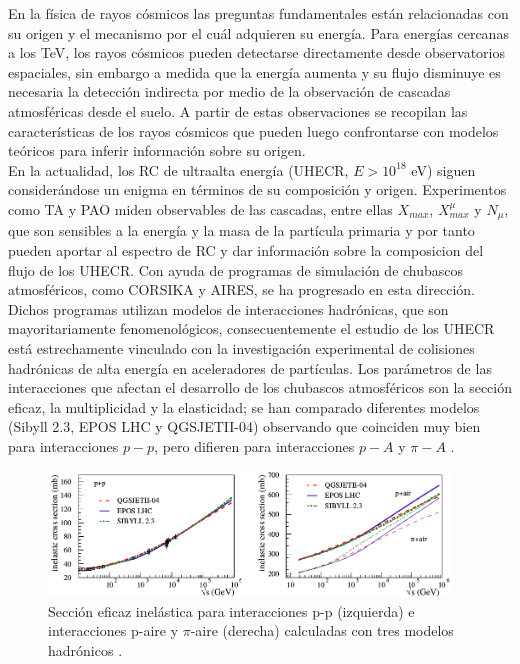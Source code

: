 En la f\'isica de rayos c\'osmicos las preguntas fundamentales est\'an relacionadas con su origen y el mecanismo por el cu\'al adquieren su energ\'ia. Para energ\'ias cercanas a los TeV, los rayos c\'osmicos pueden detectarse directamente desde observatorios espaciales, sin embargo a medida que la energ\'ia aumenta y su flujo disminuye es necesaria la detecci\'on indirecta por medio de la observaci\'on de cascadas atmosf\'ericas desde el suelo. A partir de estas observaciones se recopilan las caracter\'isticas de los rayos c\'osmicos que pueden luego confrontarse con modelos te\'oricos para inferir informaci\'on sobre su origen. \\

En la actualidad, los RC de ultraalta energía (UHECR, $E > 10^{18}$ eV) siguen considerándose un enigma en términos de su composición y origen. Experimentos como TA y PAO miden observables de las cascadas, entre ellas $X_{max}$, $X_{max}^{\mu}$ y $N_{\mu}$, que son sensibles a la energía y la masa de la partícula primaria y por tanto pueden aportar al espectro de RC y dar información sobre la composicion del flujo de los UHECR. Con ayuda de programas de simulación de chubascos atmosféricos, como CORSIKA y AIRES, se ha progresado en esta dirección. \\

Dichos programas utilizan modelos de interacciones hadrónicas, que son mayoritariamente fenomenológicos, consecuentemente el estudio de los UHECR está estrechamente vinculado con la investigación experimental de colisiones hadrónicas de alta energía en aceleradores de partículas. Los parámetros de las interacciones que afectan el desarrollo de los chubascos atmosféricos son la sección eficaz, la multiplicidad y la elasticidad; se han comparado diferentes modelos (Sibyll 2.3, EPOS LHC y QGSJETII-04) observando que coinciden muy bien para interacciones $p-p$, pero difieren para interacciones $p-A$ y $\pi-A$ \cite{Pierog2018}. \\

\begin{figure}[h]
\centering
\includegraphics[width=0.95\textwidth]{Figuras/Pierog2018} 
\caption{Sección eficaz inelástica para interacciones p-p (izquierda) e interacciones p-aire y $\pi$-aire (derecha) calculadas con tres modelos hadrónicos \cite{Pierog2018}.}
\label{fig:cross_sections}
\end{figure}	

